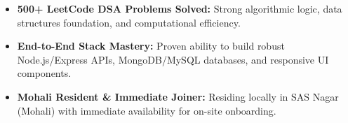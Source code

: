 \documentclass[a4paper,10pt]{article}
\begin{document}
\begin{itemize}

    \item \textbf{500+ LeetCode DSA Problems Solved:} Strong algorithmic logic, data structures foundation, and computational efficiency.

    \item \textbf{End-to-End Stack Mastery:} Proven ability to build robust Node.js/Express APIs, MongoDB/MySQL databases, and responsive UI components.

    \item \textbf{Mohali Resident \& Immediate Joiner:} Residing locally in SAS Nagar (Mohali) with immediate availability for on-site onboarding.

\end{itemize}

\end{document}

